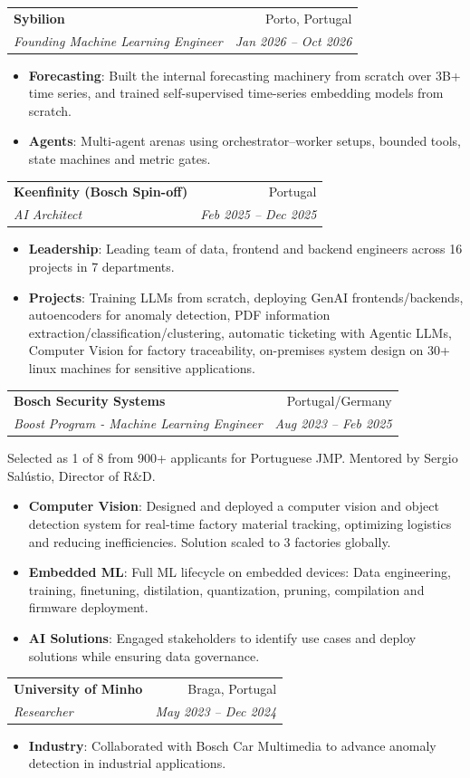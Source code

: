 \documentclass[letterpaper,11pt]{article}
\makeatletter
\newcommand{\resumeItem}[2]{
  \item\small{
    \textbf{#1}{: #2 \vspace{-2pt}}
  }
}
\newcommand{\resumePlainItem}[1]{
  \vspace{-1pt}
  \begin{list}{}{
    \setlength{\leftmargin}{0em}
    \setlength{\itemsep}{0pt}
    \setlength{\parsep}{0pt}
    \setlength{\topsep}{0pt}
  }
  \item[] \small{#1 \vspace{-2pt}}
  \end{list}
  \vspace{-5pt}
}
\newcommand{\resumeSubheading}[4]{
  \vspace{-1pt}\item
    \begin{tabular*}{0.97\textwidth}[t]{l@{\extracolsep{\fill}}r}
      \textbf{#1} & #2 \\
      \textit{\small#3} & \textit{\small #4} \\
    \end{tabular*}\vspace{-5pt}
}
\newcommand{\resumeItemListStart}{\begin{itemize}}
\newcommand{\resumeItemListEnd}{\end{itemize}\vspace{-5pt}}
\makeatother
\begin{document}
    \resumeSubheading
      {Sybilion}{Porto, Portugal}
      {Founding Machine Learning Engineer}{Jan 2026 -- Oct 2026}
      \resumeItemListStart
        \resumeItem{Forecasting}
          {Built the internal forecasting machinery from scratch over 3B+ time series, and trained self-supervised time-series embedding models from scratch.}
        \resumeItem{Agents}
          {Multi-agent arenas using orchestrator--worker setups, bounded tools, state machines and metric gates.}
      \resumeItemListEnd

    \resumeSubheading
      {Keenfinity (Bosch Spin-off)}{Portugal}
      {AI Architect}{Feb 2025 -- Dec 2025}
      \resumeItemListStart
        \resumeItem{Leadership}
          {Leading team of data, frontend and backend engineers across 16 projects in 7 departments.}
        \resumeItem{Projects}
          {Training LLMs from scratch, deploying GenAI frontends/backends, autoencoders for anomaly detection, PDF information extraction/classification/clustering, automatic ticketing with Agentic LLMs, Computer Vision for factory traceability, on-premises system design on 30+ linux machines for sensitive applications.}
      \resumeItemListEnd

    \resumeSubheading
      {Bosch Security Systems}{Portugal/Germany}
      {Boost Program - Machine Learning Engineer}{Aug 2023 -- Feb 2025}
      \resumePlainItem{Selected as 1 of 8 from 900+ applicants for Portuguese JMP. Mentored by Sergio Salústio, Director of R\&D.}
      \resumeItemListStart
        \resumeItem{Computer Vision}
            {Designed and deployed a computer vision and object detection system for real-time factory material tracking, optimizing logistics and reducing inefficiencies. Solution scaled to 3 factories globally.}
        \resumeItem{Embedded ML}
            {Full ML lifecycle on embedded devices: Data engineering, training, finetuning, distilation, quantization, pruning, compilation and firmware deployment.}
        \resumeItem{AI Solutions}
            {Engaged stakeholders to identify use cases and deploy solutions while ensuring data governance.}
      \resumeItemListEnd

    \resumeSubheading
      {University of Minho}{Braga, Portugal}
      {Researcher}{May 2023 -- Dec 2024}
      \resumeItemListStart
        \resumeItem{Industry}
          {Collaborated with Bosch Car Multimedia to advance anomaly detection in industrial applications.}
      \resumeItemListEnd
\end{document}
